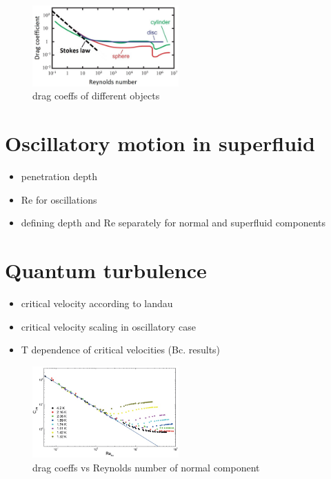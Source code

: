 \begin{figure}[h]
	\centering
	\includegraphics[width=0.5\textwidth]{graphics/theory/C-Re}
	\caption{drag coeffs of different objects}
	\label{C-Re}
\end{figure}


\section{Oscillatory motion in superfluid}
\begin{itemize}
	\item penetration depth
	\item Re for oscillations
	\item defining depth and Re separately for normal and superfluid components
\end{itemize}

\section{Quantum turbulence}
\begin{itemize}
	\item critical velocity according to landau
	\item critical velocity scaling in oscillatory case
	\item T dependence of critical velocities (Bc. results)
\end{itemize}

\begin{figure}[h]
	\centering
	\includegraphics[width=0.5\textwidth]{graphics/theory/C-Re_normal}
	\caption{drag coeffs vs Reynolds number of normal component}
	\label{C-Re_normal}
\end{figure}

